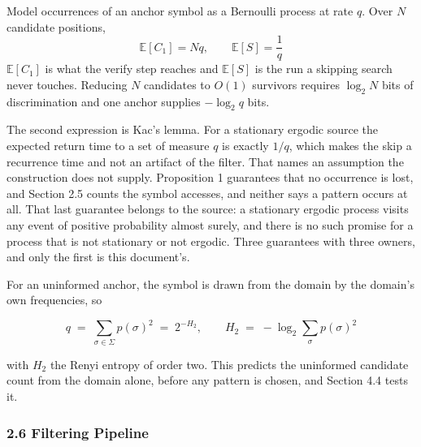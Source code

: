 Model occurrences of an anchor symbol as a Bernoulli process at rate \(q\). Over \(N\) candidate positions,
\[
  \mathbb{E}[C_1] = N q, \qquad \mathbb{E}[S] = \frac{1}{q}
\]
\(\mathbb{E}[C_1]\) is what the verify step reaches and \(\mathbb{E}[S]\) is the run a skipping search never touches. Reducing \(N\) candidates to \(O(1)\) survivors requires \(\log_2 N\) bits of discrimination and one anchor supplies \(-\log_2 q\) bits.

The second expression is Kac's lemma. For a stationary ergodic source the expected return time to a set of measure \(q\) is exactly \(1/q\), which makes the skip a recurrence time and not an artifact of the filter. That names an assumption the construction does not supply. Proposition 1 guarantees that no occurrence is lost, and Section 2.5 counts the symbol accesses, and neither says a pattern occurs at all. That last guarantee belongs to the source: a stationary ergodic process visits any event of positive probability almost surely, and there is no such promise for a process that is not stationary or not ergodic. Three guarantees with three owners, and only the first is this document's.

For an uninformed anchor, the symbol is drawn from the domain by the domain's own frequencies, so

\[
q \;=\; \sum_{\sigma \in \Sigma} p(\sigma)^2 \;=\; 2^{-H_2}, \qquad
H_2 \;=\; -\log_2 \sum_{\sigma} p(\sigma)^2
\]

with \(H_2\) the Renyi entropy of order two. This predicts the uninformed candidate count from the domain alone, before any pattern is chosen, and Section 4.4 tests it.

\subsubsection{2.6 Filtering Pipeline}

